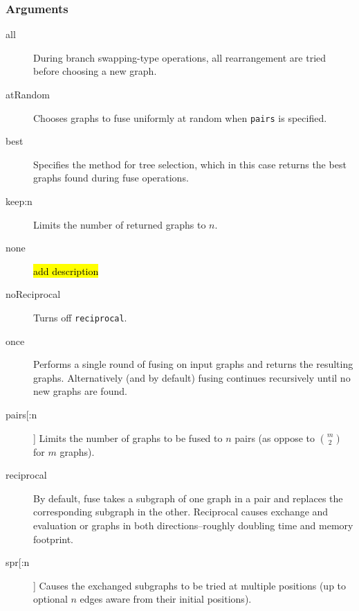 	\subsubsection{Arguments}
	\begin{description}
		\item [all]  During branch swapping-type operations, all rearrangement are tried before choosing a new graph. 
		
		
		\item [atRandom] Chooses graphs to fuse uniformly at random when \texttt{pairs} is specified. 
		
		\item [best] Specifies the method for tree selection, which in this case returns the best graphs 
		found during fuse operations.		
		
		\item [keep:n] Limits the number of returned graphs to $n$. 
		
		\item [none] \hl{add description}
		
		\item [noReciprocal] Turns off \texttt{reciprocal}.
		
		\item [once] Performs a single round of fusing on input graphs and returns the resulting graphs. 
		Alternatively (and by default) fusing continues recursively until no new graphs are found.
		
		\item [pairs[:n]] Limits the number of graphs to be fused to $n$ pairs (as oppose to $\binom{m}{2}$ for $m$ graphs).
		
		\item [reciprocal] By default, fuse takes a subgraph of one graph in a pair and replaces the corresponding subgraph 
		in the other.  Reciprocal causes exchange and evaluation or graphs in both directions--roughly doubling time and 
		memory footprint.
		
		\item [spr[:n]] Causes the exchanged subgraphs to be tried at multiple positions (up to optional 
		$n$ edges aware from their initial positions).
		

\end{description}
